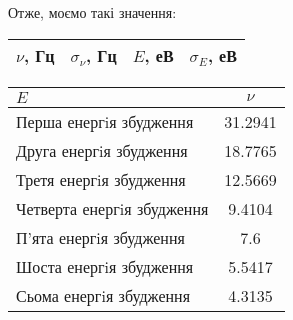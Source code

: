 \documentclass[12pt,a4paper]{article}
\begin{document}
Отже, моємо такі значення:

\begin{table}[h]
	\centering
	\begin{tabular}{llll}
		\hline
		$\nu$, Гц & $\sigma_\nu$, Гц & $E$, еВ & $\sigma_E$, еВ\\

		\hline
	\end{tabular}
\end{table}

\begin{center}
    \begin{tabular}{l|c}
        \hline
        $E$                         & $\nu$ \\
        \hline
         Перша енергiя збудження    & 31.2941 \\
         \hline
         Друга енергiя збудження    & 18.7765 \\
         \hline
         Третя енергiя збудження    & 12.5669 \\
         \hline
         Четверта енергiя збудження &  9.4104 \\
         \hline
         П'ята енергiя збудження    &  7.6    \\
         \hline
         Шоста енергiя збудження    &  5.5417 \\
         \hline
         Сьома енергiя збудження    &  4.3135 \\
        \hline
    \end{tabular}
\end{center}
\end{document}
